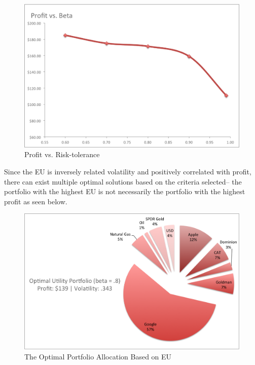 \documentclass[12pt]{article}
\begin{document}
{\begin{figure}[H]
\begin{center}
\includegraphics[scale=.6]{Figures/profit_v_beta.png}
\caption{Profit vs. Risk-tolerance}
\end{center}
\end{figure}


Since the EU is inversely related volatility and positively correlated with profit, there can exist multiple optimal solutions based on the criteria selected-- the portfolio with the highest EU is not necessarily the portfolio with the highest profit as seen below. 

\begin{figure}[H]
\begin{center}
\includegraphics[scale=.75]{Figures/OptimalPort_EU.png}
\caption{The Optimal Portfolio Allocation Based on EU}
\end{center}
\end{figure}

}
\end{document}
